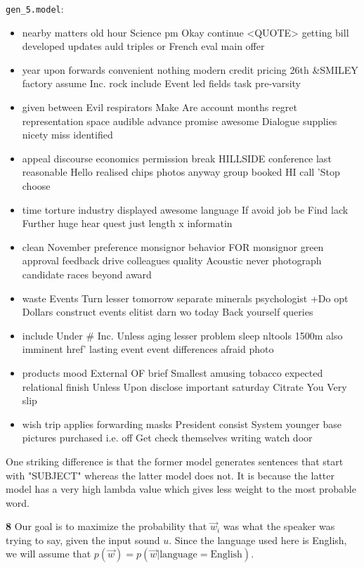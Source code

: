 \documentclass{article}
\begin{document}
\texttt{gen\_5.model}:
\begin{itemize}
	\item nearby matters old hour Science pm Okay continue <QUOTE> getting bill developed updates auld triples or French eval main offer
	\item year upon forwards convenient nothing modern credit pricing 26th \&SMILEY factory assume Inc. rock include Event led fields task pre-varsity
	\item given between Evil respirators Make Are account months regret representation space audible advance promise awesome Dialogue supplies nicety miss identified
	\item appeal discourse economics permission break HILLSIDE conference last reasonable Hello realised chips photos anyway group booked HI call 'Stop choose
	\item time torture industry displayed awesome language If avoid job be Find lack Further huge hear quest just length x informatin
	\item clean November preference monsignor behavior FOR monsignor green approval feedback drive colleagues quality Acoustic never photograph candidate races beyond award
	\item waste Events Turn lesser tomorrow separate minerals psychologist +Do opt Dollars construct events elitist darn wo today Back yourself queries
	\item include Under \# Inc. Unless aging lesser problem sleep nltools 1500m also imminent href' lasting event event differences afraid photo
	\item products mood External OF brief Smallest amusing tobacco expected relational finish Unless Upon disclose important saturday Citrate You Very slip
	\item wish trip applies forwarding masks President consist System younger base pictures purchased i.e. off Get check themselves writing watch door
\end{itemize}

One striking difference is that the former model generates sentences that start with "SUBJECT" whereas the latter model does not. It is because the latter model has a very high lambda value which gives less weight to the most probable word.

\pagebreak

\textbf{8} Our goal is to maximize the probability that $\vec{w}_i$ was what the speaker was trying to say, given the input sound $u$. Since the language used here is English, we will assume that $p(\vec{w}) = p(\vec{w} | \text{language} = \text{English})$.
\end{document}
